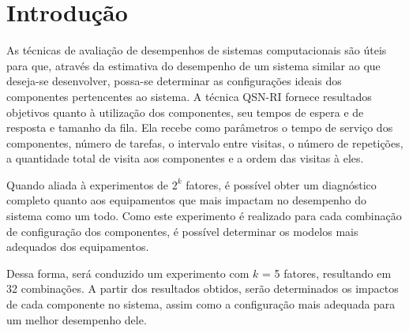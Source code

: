 \chapter{Introdução}

As técnicas de avaliação de desempenhos de sistemas computacionais são úteis para que, através da estimativa do desempenho de um sistema similar ao que deseja-se desenvolver, possa-se determinar as configurações ideais dos componentes pertencentes ao sistema. A técnica QSN-RI fornece resultados objetivos quanto à utilização dos componentes, seu tempos de espera e de resposta e tamanho da fila. Ela recebe como parâmetros o tempo de serviço dos componentes, número de tarefas, o intervalo entre visitas, o número de repetições, a quantidade total de visita aos componentes e a ordem das visitas à eles.

Quando aliada à experimentos de $2^k$ fatores, é possível obter um diagnóstico completo quanto aos equipamentos que mais impactam no desempenho do sistema como um todo. Como este experimento é realizado para cada combinação de configuração dos componentes, é possível determinar os modelos mais adequados dos equipamentos.

Dessa forma, será conduzido um experimento com $k$ = 5 fatores, resultando em 32 combinações. A partir dos resultados obtidos, serão determinados os impactos de cada componente no sistema, assim como a configuração mais adequada para um melhor desempenho dele.








